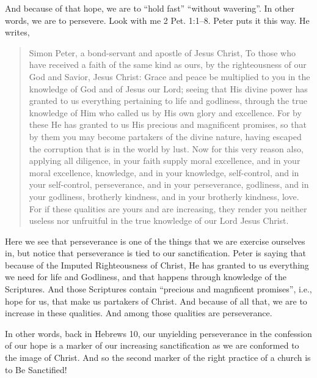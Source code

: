 \documentclass[letterpaper, 12pt]{article}
\begin{document}
    And because of that hope, we are to ``hold fast'' ``without
    wavering''. In other words, we are to persevere. Look with me 2
    Pet. 1:1--8. Peter puts it this way. He writes,

    \begin{quote}

        Simon Peter, a bond-servant and apostle of Jesus Christ, To
        those who have received a faith of the same kind as ours, by the
        righteousness of our God and Savior, Jesus Christ: Grace and
        peace be multiplied to you in the knowledge of God and of Jesus
        our Lord; seeing that His divine power has granted to us
        everything pertaining to life and godliness, through the true
        knowledge of Him who called us by His own glory and excellence.
        For by these He has granted to us His precious and magnificent
        promises, so that by them you may become partakers of the divine
        nature, having escaped the corruption that is in the world by
        lust. Now for this very reason also, applying all diligence, in
        your faith supply moral excellence, and in your moral
        excellence, knowledge, and in your knowledge, self-control, and
        in your self-control, perseverance, and in your perseverance,
        godliness, and in your godliness, brotherly kindness, and in
        your brotherly kindness, love. For if these qualities are yours
        and are increasing, they render you neither useless nor
        unfruitful in the true knowledge of our Lord Jesus Christ.

    \end{quote}

    Here we see that perseverance is one of the things that we are
    exercise ourselves in, but notice that perseverance is tied to our
    sanctification. Peter is saying that because of the Imputed
    Righteousness of Christ, He has granted to us everything we need for
    life and Godliness, and that happens through knowledge of the
    Scriptures. And those Scriptures contain ``precious and magnficent
    promises'', i.e., hope for us, that make us partakers of Christ. And
    because of all that, we are to increase in these qualities. And
    among those qualities are perseverance.

    In other words, back in Hebrews 10, our unyielding perseverance in
    the confession of our hope is a marker of our increasing
    sanctification as we are conformed to the image of Christ. And so
    the second marker of the right practice of a church is to Be
    Sanctified!
\end{document}
